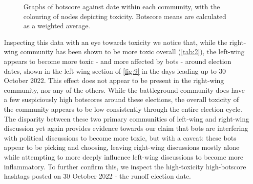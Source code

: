 \documentclass[a4paper,11pt]{article}  %
\begin{document}
	\begin{figure}%
		\begin{center}
		\end{center}
		\caption{Graphs of botscore against date within each community, with the colouring of nodes depicting toxicity. Botscore means are calculated as a weighted average.}
		\label{fig:9}
	\end{figure}\textbf{}
	
	Inspecting this data with an eye towards toxicity we notice that, while the right-wing community has been shown to be more toxic overall (\autoref{tab:2}), the left-wing appears to become more toxic - and more affected by bots - around election dates, shown in the left-wing section of \autoref{fig:9} in the days leading up to 30 October 2022. This effect does not appear to be present in the right-wing community, nor any of the others. While the battleground community does have a few suspiciously high botscores around these elections, the overall toxicity of the community appears to be low consistently through the entire election cycle. The disparity between these two primary communities of left-wing and right-wing discussion yet again provides evidence towards our claim that bots are interfering with political discussions to become more toxic, but with a caveat: these bots appear to be picking and choosing, leaving right-wing discussions mostly alone while attempting to more deeply influence left-wing discussions to become more inflammatory. To further confirm this, we inspect the high-toxicity high-botscore hashtags posted on 30 October 2022 - the runoff election date.
	
\end{document}
